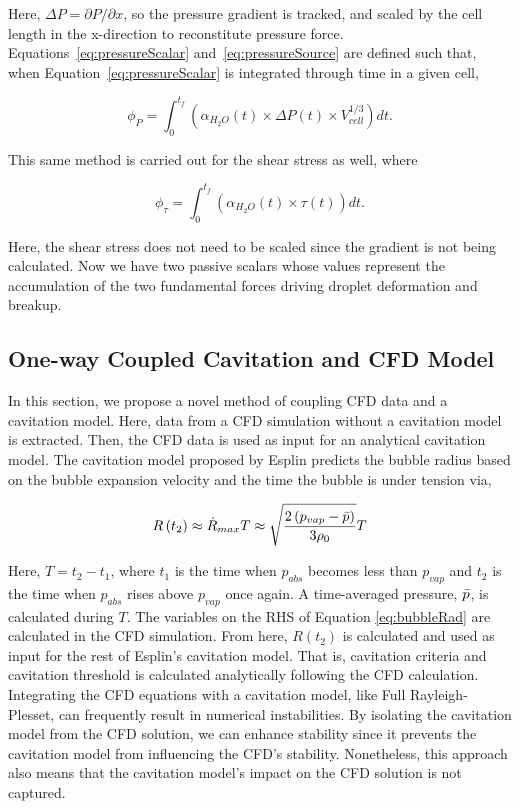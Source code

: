 \documentclass{UCF_ETD}
\begin{document}
\noindent Here, $\Delta P = \partial P / \partial x$, so the pressure gradient is tracked, and scaled by the cell length in the x-direction to reconstitute pressure force. Equations~\ref{eq:pressureScalar} and~\ref{eq:pressureSource} are defined such that, when Equation~\ref{eq:pressureScalar} is integrated through time in a given cell, 

\begin{equation}
    \phi_{P} =  \int_{0}^{t_{f}} \left( \alpha_{H_{2}O}(t) \times \Delta P(t) \times V_{cell}^{1/3} \right) dt. 
    \label{eq:pressureIntegrated}
\end{equation}

\noindent This same method is carried out for the shear stress as well, where

\begin{equation}
    \phi_{\tau} =  \int_{0}^{t_{f}} \left( \alpha_{H_{2}O}(t) \times \tau(t) \right) dt. 
    \label{eq:shearIntegrated}
\end{equation}

\noindent Here, the shear stress does not need to be scaled since the gradient is not being calculated. Now we have two passive scalars whose values represent the accumulation of the two fundamental forces driving droplet deformation and breakup.

\subsection{One-way Coupled Cavitation and CFD Model}
\label{sec:onewaycav}
In this section, we propose a novel method of coupling CFD data and a cavitation model. Here, data from a CFD simulation without a cavitation model is extracted. Then, the CFD data is used as input for an analytical cavitation model. The cavitation model proposed by Esplin \cite{esplin2016bulk, Esplin2016} predicts the bubble radius based on the bubble expansion velocity and the time the bubble is under tension via,

\begin{equation}
    R \left( t_{2} \right) \approx \dot{R}_{max}T \approx \sqrt{\frac{2 \left( p_{vap} - \Bar{p} \right)}{3 \rho_{0}}}T
    \label{eq:bubbleRad}
\end{equation}

\noindent Here, $T=t_{2}-t_{1}$, where $t_{1}$ is the time when $p_{abs}$ becomes less than $p_{vap}$ and $t_{2}$ is the time when $p_{abs}$ rises above $p_{vap}$ once again. A time-averaged pressure, $\Bar{p}$, is calculated during $T$. The variables on the RHS of Equation \ref{eq:bubbleRad} are calculated in the CFD simulation. From here, $R \left( t_{2} \right)$ is calculated and used as input for the rest of Esplin's cavitation model. That is, cavitation criteria and cavitation threshold \cite{esplin2016bulk,Esplin2016} is calculated analytically following the CFD calculation. Integrating the CFD equations with a cavitation model, like Full Rayleigh-Plesset, can frequently result in numerical instabilities.  By isolating the cavitation model from the CFD solution, we can enhance stability since it prevents the cavitation model from influencing the CFD’s stability. Nonetheless, this approach also means that the cavitation model’s impact on the CFD solution is not captured.
\end{document}
